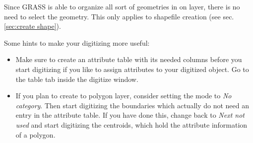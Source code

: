Since GRASS is able to organize all sort of geometries in on layer, there is no need to select
the geometry. This only applies to shapefile creation (see sec. \ref{sec:create shape}).

Some hints to make your digitizing more useful:
\begin{itemize}
\item Make sure to create an attribute table with its needed columns before you start digitizing
if you like to assign attributes to  your digitized object. 
Go to the table tab inside the digitize window.
\item If you plan to create to polygon layer, consider setting the mode to \textsl{No category}. 
Then start digitizing the boundaries which actually do not need an entry in the attribute table. 
If you have done this, change back to \textsl{Next not used} and start digitizing the centroids, which 
hold the attribute information of a polygon.

\end{itemize}


